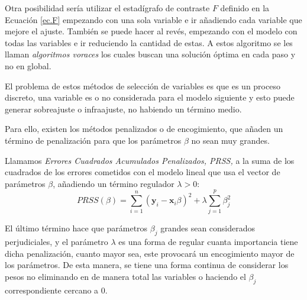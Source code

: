 \noindent Otra posibilidad sería utilizar el estadígrafo de contraste $F$ definido en la Ecuación \eqref{ec.F} empezando con una sola variable e ir añadiendo cada variable que mejore el ajuste. También se puede hacer al revés, empezando con el modelo con todas las variables e ir reduciendo la cantidad de estas. A estos algoritmo se les llaman \emph{algoritmos voraces} los cuales buscan una solución óptima en cada paso y no en global. 

\noindent El problema de estos métodos de selección de variables es que es un proceso discreto, una variable es o no considerada para el modelo siguiente y esto puede generar sobreajuste o infraajuste, no habiendo un término medio. 

\noindent Para ello, existen los métodos penalizados o de encogimiento, que añaden un término de penalización para que los parámetros $\beta$ no sean muy grandes.

\begin{defi} 
Llamamos \emph{Errores Cuadrados Acumulados Penalizados, PRSS,} a la suma de los cuadrados de los errores cometidos con el modelo lineal que usa el  vector de parámetros $\beta$, añadiendo un término regulador $\lambda >0$: 
\begin{equation}
PRSS(\beta)=\sum_{i=1}^n(\textbf{y}_i-\textbf{x}_i\beta)^2+\lambda\sum_{j=1}^p\beta_j^2
\end{equation}
\end{defi}
\noindent El último término hace que parámetros $\beta_j$ grandes sean considerados perjudiciales, y el parámetro $\lambda$ es una forma de regular cuanta importancia tiene dicha penalización, cuanto mayor sea, este provocará un encogimiento mayor de los parámetros. 
De esta manera, se tiene una forma continua de considerar los pesos no eliminando en de manera total las variables o haciendo el $\beta_j$ correspondiente cercano a 0. 















